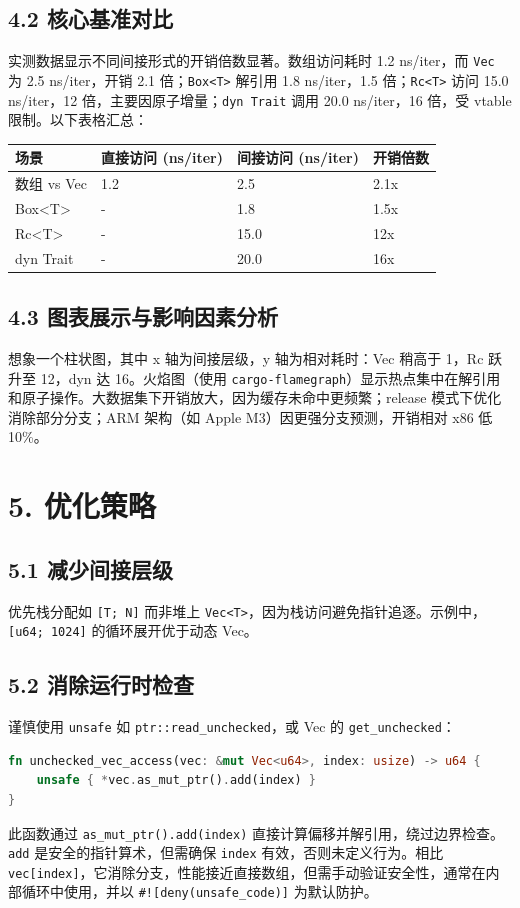 \section{4.2 核心基准对比}
实测数据显示不同间接形式的开销倍数显著。数组访问耗时 1.2 ns/iter，而 \texttt{Vec} 为 2.5 ns/iter，开销 2.1 倍；\texttt{Box<T>} 解引用 1.8 ns/iter，1.5 倍；\texttt{Rc<T>} 访问 15.0 ns/iter，12 倍，主要因原子增量；\texttt{dyn Trait} 调用 20.0 ns/iter，16 倍，受 vtable 限制。以下表格汇总：\par
\begin{table}[H]
\centering
\begin{tabular}{|l|l|l|l|}
\hline
场景 & 直接访问 (ns/iter) & 间接访问 (ns/iter) & 开销倍数 \\
\hline
数组 vs Vec & 1.2 & 2.5 & 2.1x \\
\hline
Box<T> & - & 1.8 & 1.5x \\
\hline
Rc<T> & - & 15.0 & 12x \\
\hline
dyn Trait & - & 20.0 & 16x \\
\hline
\end{tabular}
\end{table}
\section{4.3 图表展示与影响因素分析}
想象一个柱状图，其中 x 轴为间接层级，y 轴为相对耗时：Vec 稍高于 1，Rc 跃升至 12，dyn 达 16。火焰图（使用 \texttt{cargo-flamegraph}）显示热点集中在解引用和原子操作。大数据集下开销放大，因为缓存未命中更频繁；release 模式下优化消除部分分支；ARM 架构（如 Apple M3）因更强分支预测，开销相对 x86 低 10\%{}。\par
\chapter{5. 优化策略}
\section{5.1 减少间接层级}
优先栈分配如 \texttt{[T; N]} 而非堆上 \texttt{Vec<T>}，因为栈访问避免指针追逐。示例中，\texttt{[u64; 1024]} 的循环展开优于动态 Vec。\par
\section{5.2 消除运行时检查}
谨慎使用 \texttt{unsafe} 如 \texttt{ptr::read\_{}unchecked}，或 Vec 的 \texttt{get\_{}unchecked}：\par
\begin{lstlisting}[language=rust]
fn unchecked_vec_access(vec: &mut Vec<u64>, index: usize) -> u64 {
    unsafe { *vec.as_mut_ptr().add(index) }
}
\end{lstlisting}
此函数通过 \texttt{as\_{}mut\_{}ptr().add(index)} 直接计算偏移并解引用，绕过边界检查。\texttt{add} 是安全的指针算术，但需确保 \texttt{index} 有效，否则未定义行为。相比 \texttt{vec[index]}，它消除分支，性能接近直接数组，但需手动验证安全性，通常在内部循环中使用，并以 \texttt{\#{}![deny(unsafe\_{}code)]} 为默认防护。\par
